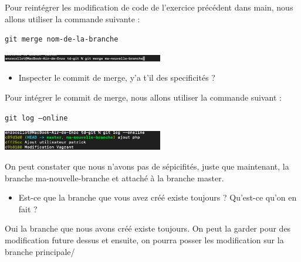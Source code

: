 \documentclass[12pt]{article}
\begin{document}
\vspace{0.3cm}

Pour reintégrer les modification de code de l'exercice précédent dans main, nous allons utiliser la commande suivante : 

\texttt{git merge nom-de-la-branche}

\vspace{0.3cm}

\begin{center}
  \includegraphics[width=7cm]{Image-TD-Git-3/git-merge.png}
\end{center}

\vspace{0.3cm}

\begin{itemize}
  \item Inspecter le commit de merge, y'a t'il des specificités ?
\end{itemize}

\vspace{0.3cm}

Pour intégrer le commit de merge, nous allons utiliser la commande suivant : 

\texttt{git log --online}

\vspace{0.3cm}

\begin{center}
  \includegraphics[width=7cm]{Image-TD-Git-3/git-log.png}
\end{center}

\vspace{0.3cm}

On peut constater que nous n'avons pas de sépicifités, juste que maintenant, la branche ma-nouvelle-branche et attaché à la branche master.

\vspace{0.3cm}

\begin{itemize}
  \item Est-ce que la branche que vous avez créé existe toujours ? Qu'est-ce qu'on en fait ?
\end{itemize}

\vspace{0.3cm}

Oui la branche que nous avons créé existe toujours. On peut la garder pour des modification future dessus et ensuite, on pourra posser les modification sur la branche principale/
\end{document}

